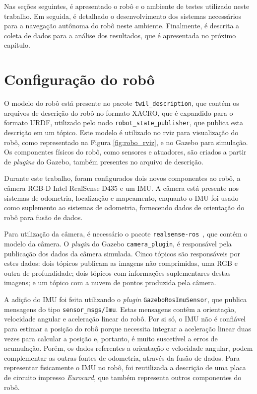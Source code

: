 \documentclass[repeatfields,xlists,xpacks,oneside,yearsonly]{ufrgscca}
\begin{document}
Nas seções seguintes, é apresentado o robô e o ambiente de testes
utilizado neste trabalho. Em seguida, é detalhado o desenvolvimento
dos sistemas necessários para a navegação autônoma do robô neste
ambiente. Finalmente, é descrita a coleta de dados para a análise dos
resultados, que é apresentada no próximo capítulo.

\section{Configuração do robô}

O modelo do robô está presente no pacote \texttt{twil\_description},
que contém os arquivos de descrição do robô no formato XACRO, que é
expandido para o formato URDF, utilizado pelo nodo
\texttt{robot\_state\_publisher}, que publica esta descrição em um
tópico. Este modelo é utilizado no rviz para visualização do robô,
como representado na Figura \ref{fig:robo_rviz}, e no Gazebo para
simulação. Os componentes físicos do robô, como sensores e atuadores,
são criados a partir de \textit{plugins} do Gazebo, também presentes
no arquivo de descrição.

Durante este trabalho, foram configurados dois novos componentes ao
robô, a câmera RGB-D Intel RealSense D435 e um IMU. A câmera está
presente nos sistemas de odometria, localização e mapeamento,
enquanto o IMU foi usado como suplemento ao sistemas de odometria,
fornecendo dados de orientação do robô para fusão de dados.

Para utilização da câmera, é necessário o pacote
\texttt{realsense-ros}~\cite{realsense_ros}, que contém o modelo da
câmera. O \textit{plugin} do Gazebo \texttt{camera\_plugin}, é
responsável pela publicação dos dados da câmera simulada. Cinco
tópicos são responsáveis por estes dados: dois tópicos publicam as
imagens não comprimidas, uma RGB e outra de profundidade; dois
tópicos com informações suplementares destas imagens; e um tópico com
a nuvem de pontos produzida pela câmera.

A adição do IMU foi feita utilizando o \textit{plugin}
\texttt{GazeboRosImuSensor}, que publica mensagens do tipo
\texttt{sensor\_msgs/Imu}. Estas mensagens contêm a orientação,
velocidade angular e aceleração linear do robô. Por si só, o IMU não
é confiável para estimar a posição do robô porque necessita integrar
a aceleração linear duas vezes para calcular a posição e, portanto, é
muito suscetível a erros de acumulação. Porém, os dados referentes a
orientação e velocidade angular, podem complementar as outras fontes
de odometria, através da fusão de dados. Para representar fisicamente
o IMU no robô, foi reutilizada a descrição de uma placa de circuito
impresso \textit{Eurocard}, que também representa outros componentes
do robô.
\end{document}
